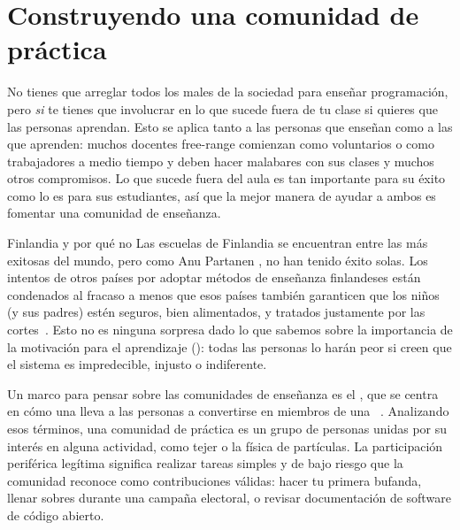 \chapter{Construyendo una comunidad de práctica}\label{s:community}

No tienes que arreglar todos los males de la sociedad para enseñar programación,
pero \emph{si} te tienes que involucrar en
lo que sucede fuera de tu clase si quieres que las personas aprendan.
Esto se aplica tanto a las personas que enseñan como a las que aprenden:
muchos docentes free-range comienzan como voluntarios o como trabajadores a medio tiempo
y deben hacer malabares con sus clases y muchos otros compromisos.
Lo que sucede fuera del aula es tan importante para su éxito 
como lo es para sus estudiantes,
así que la mejor manera de ayudar a ambos es fomentar una comunidad de enseñanza.


\begin{aside}{Finlandia y por qué no}
Las escuelas de Finlandia se encuentran entre las más exitosas del mundo,
  pero como Anu Partanen
  ,
  no han tenido éxito solas.
  Los intentos de otros países por adoptar métodos de enseñanza finlandeses están condenados al fracaso
  a menos que esos países también garanticen que los niños (y sus padres) estén seguros,
  bien alimentados,
  y tratados justamente por las cortes~\cite{Sahl2015, Wilk2011}.
  Esto no es ninguna sorpresa dado lo que sabemos sobre la importancia de la motivación para el aprendizaje ():
  todas las personas lo harán peor si creen que el sistema es impredecible, injusto o indiferente.
\end{aside}

Un marco para pensar sobre las comunidades de enseñanza es el ,
que se centra en cómo una 
lleva a las personas a convertirse en miembros de
una ~\cite{Weng2015}.
Analizando esos términos,
una comunidad de práctica es un grupo de personas unidas por su interés en alguna actividad,
como tejer o la física de partículas.
La participación periférica legítima significa realizar tareas simples y de bajo riesgo
que la comunidad reconoce como contribuciones válidas:
hacer tu primera bufanda,
llenar sobres durante una campaña electoral,
o revisar documentación de software de código abierto.

